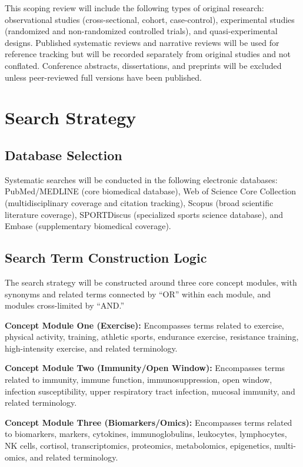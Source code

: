 \documentclass[12pt,a4paper]{article}
\begin{document}
This scoping review will include the following types of original research: observational studies (cross-sectional, cohort, case-control), experimental studies (randomized and non-randomized controlled trials), and quasi-experimental designs. Published systematic reviews and narrative reviews will be used for reference tracking but will be recorded separately from original studies and not conflated. Conference abstracts, dissertations, and preprints will be excluded unless peer-reviewed full versions have been published.

\section{Search Strategy}

\subsection{Database Selection}

Systematic searches will be conducted in the following electronic databases: PubMed/MEDLINE (core biomedical database), Web of Science Core Collection (multidisciplinary coverage and citation tracking), Scopus (broad scientific literature coverage), SPORTDiscus (specialized sports science database), and Embase (supplementary biomedical coverage).

\subsection{Search Term Construction Logic}

The search strategy will be constructed around three core concept modules, with synonyms and related terms connected by ``OR'' within each module, and modules cross-limited by ``AND.''

\textbf{Concept Module One (Exercise):} Encompasses terms related to exercise, physical activity, training, athletic sports, endurance exercise, resistance training, high-intensity exercise, and related terminology.

\textbf{Concept Module Two (Immunity/Open Window):} Encompasses terms related to immunity, immune function, immunosuppression, open window, infection susceptibility, upper respiratory tract infection, mucosal immunity, and related terminology.

\textbf{Concept Module Three (Biomarkers/Omics):} Encompasses terms related to biomarkers, markers, cytokines, immunoglobulins, leukocytes, lymphocytes, NK cells, cortisol, transcriptomics, proteomics, metabolomics, epigenetics, multi-omics, and related terminology.
\end{document}
